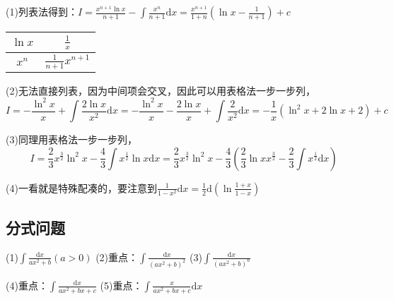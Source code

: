 \begin{solution}
  (1)列表法得到：$I = \frac{x^{n+1}\ln x}{n+1} - \int \frac{x^n}{n+1}\mathrm{d} x = \frac{x^{n+1}}{1+n}(\ln x - \frac{1}{n+1})+ c$
  \begin{center}
    \begin{tabular}[htp]{|c|c|}
      \hline
      $\ln x$& $\frac{1}{x}$\\
      \hline
      $x^n$&$\frac{1}{n+1} x^{n+1}$\\
      \hline
    \end{tabular}
  \end{center}

  (2)无法直接列表，因为中间项会交叉，因此可以用表格法一步一步列，
  \begin{equation*}
    I = - \frac{\ln^2 x}{x} + \int \frac{2\ln x}{x^2}\mathrm{d} x = - \frac{\ln^2 x}{x} - \frac{2\ln x}{x} + \int \frac{2}{x^2} \mathrm{d} x = - \frac{1}{x} (\ln^2 x + 2 \ln x + 2)+c
  \end{equation*}

  (3)同理用表格法一步一步列，
  \begin{equation*}
    I = \frac{2}{3}x^{\frac{3}{2}}\ln^2 x  - \frac{4}{3} \int x^{\frac{1}{2}} \ln x \mathrm{d} x = \frac{2}{3}x^{\frac{3}{2}}\ln^2 x  - \frac{4}{3} \left( \frac{2}{3} \ln x x^{\frac{3}{2}} - \frac{2}{3}\int x^{\frac{1}{2}} \mathrm{d} x\right)
  \end{equation*}

  (4)一看就是特殊配凑的，要注意到$\frac{1}{1-x^2}\mathrm{d} x = \frac{1}{2} \mathrm{d} \left( \ln \frac{1+x}{1-x} \right)$
\end{solution}

\subsection{分式问题}

\begin{exercise}[几个基础型]
  (1)$\int \frac{\mathrm{d}x}{ax^2 + b}(a > 0)$
  (2)重点：$\int \frac{\mathrm{d}x}{(ax^2 + b)^2}$
  (3)$\int \frac{\mathrm{d}x}{(ax^2 + b)^n}$

  (4)重点：$\int \frac{\mathrm{d}x}{ax^2 + bx + c}$
  (5)重点：$\int \frac{x}{ax^2 + bx + c}\mathrm{d}x$

\end{exercise}

